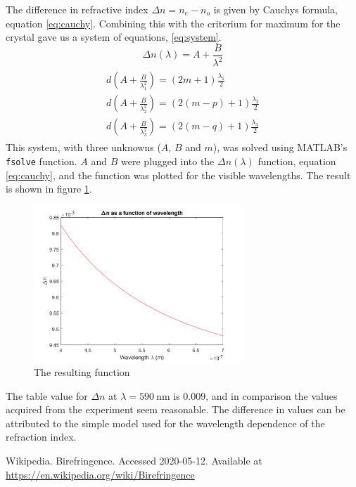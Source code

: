 \documentclass[a4paper]{article}
\begin{document}
The difference in refractive index $\Delta n = n_e - n_o$ is given by Cauchys formula, equation \ref{eq:cauchy}. Combining this with the criterium for maximum for the crystal gave us a system
of equations, \ref{eq:system}.
\begin{equation}
    \Delta n(\lambda) = A + \frac{B}{\lambda^2}
    \label{eq:cauchy}
\end{equation}
\begin{align}
\begin{split}
    d(A + \frac{B}{\lambda_1^2}) = (2m + 1)\frac{\lambda_1}{2} \\
    d(A + \frac{B}{\lambda_2^2}) = (2(m-p) + 1)\frac{\lambda_2}{2} \\
    d(A + \frac{B}{\lambda_3^2}) = (2(m-q) + 1)\frac{\lambda_3}{2}
    \label{eq:system}
\end{split}
\end{align}
This system, with three unknowns ($A$, $B$ and $m$), was solved using MATLAB's \texttt{fsolve} function. 
$A$ and $B$ were plugged into the $\Delta n(\lambda)$ function, equation \ref{eq:cauchy}, and the function was plotted for the
visible wavelengths. The result is shown in figure \ref{fig:result}.
\begin{figure}[h!]
    \centering
    \includegraphics[width=0.7\textwidth]{result.png}
    \caption{The resulting function}
    \label{fig:result}
\end{figure}
The table value for $\Delta n$ at $\lambda = \SI{590}{\nano\meter}$ is $0.009$\cite{wiki}, and in comparison the values acquired from the experiment seem reasonable.
The difference in values can be attributed to the simple model used for the wavelength dependence of the refraction index.

\begin{thebibliography}{1}
    Wikipedia. Birefringence. Accessed 2020-05-12. Available at \url{https://en.wikipedia.org/wiki/Birefringence}
\end{thebibliography}
\end{document}
